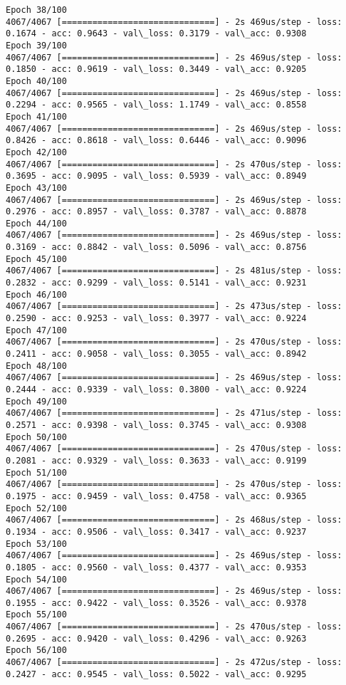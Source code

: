 \documentclass[11pt]{article}
\begin{document}
\begin{Verbatim}[commandchars=\\\{\}]
Epoch 38/100
4067/4067 [==============================] - 2s 469us/step - loss: 0.1674 - acc: 0.9643 - val\_loss: 0.3179 - val\_acc: 0.9308
Epoch 39/100
4067/4067 [==============================] - 2s 469us/step - loss: 0.1850 - acc: 0.9619 - val\_loss: 0.3449 - val\_acc: 0.9205
Epoch 40/100
4067/4067 [==============================] - 2s 469us/step - loss: 0.2294 - acc: 0.9565 - val\_loss: 1.1749 - val\_acc: 0.8558
Epoch 41/100
4067/4067 [==============================] - 2s 469us/step - loss: 0.8426 - acc: 0.8618 - val\_loss: 0.6446 - val\_acc: 0.9096
Epoch 42/100
4067/4067 [==============================] - 2s 470us/step - loss: 0.3695 - acc: 0.9095 - val\_loss: 0.5939 - val\_acc: 0.8949
Epoch 43/100
4067/4067 [==============================] - 2s 469us/step - loss: 0.2976 - acc: 0.8957 - val\_loss: 0.3787 - val\_acc: 0.8878
Epoch 44/100
4067/4067 [==============================] - 2s 469us/step - loss: 0.3169 - acc: 0.8842 - val\_loss: 0.5096 - val\_acc: 0.8756
Epoch 45/100
4067/4067 [==============================] - 2s 481us/step - loss: 0.2832 - acc: 0.9299 - val\_loss: 0.5141 - val\_acc: 0.9231
Epoch 46/100
4067/4067 [==============================] - 2s 473us/step - loss: 0.2590 - acc: 0.9253 - val\_loss: 0.3977 - val\_acc: 0.9224
Epoch 47/100
4067/4067 [==============================] - 2s 470us/step - loss: 0.2411 - acc: 0.9058 - val\_loss: 0.3055 - val\_acc: 0.8942
Epoch 48/100
4067/4067 [==============================] - 2s 469us/step - loss: 0.2444 - acc: 0.9339 - val\_loss: 0.3800 - val\_acc: 0.9224
Epoch 49/100
4067/4067 [==============================] - 2s 471us/step - loss: 0.2571 - acc: 0.9398 - val\_loss: 0.3745 - val\_acc: 0.9308
Epoch 50/100
4067/4067 [==============================] - 2s 470us/step - loss: 0.2081 - acc: 0.9329 - val\_loss: 0.3633 - val\_acc: 0.9199
Epoch 51/100
4067/4067 [==============================] - 2s 470us/step - loss: 0.1975 - acc: 0.9459 - val\_loss: 0.4758 - val\_acc: 0.9365
Epoch 52/100
4067/4067 [==============================] - 2s 468us/step - loss: 0.1934 - acc: 0.9506 - val\_loss: 0.3417 - val\_acc: 0.9237
Epoch 53/100
4067/4067 [==============================] - 2s 469us/step - loss: 0.1805 - acc: 0.9560 - val\_loss: 0.4377 - val\_acc: 0.9353
Epoch 54/100
4067/4067 [==============================] - 2s 469us/step - loss: 0.1955 - acc: 0.9422 - val\_loss: 0.3526 - val\_acc: 0.9378
Epoch 55/100
4067/4067 [==============================] - 2s 470us/step - loss: 0.2695 - acc: 0.9420 - val\_loss: 0.4296 - val\_acc: 0.9263
Epoch 56/100
4067/4067 [==============================] - 2s 472us/step - loss: 0.2427 - acc: 0.9545 - val\_loss: 0.5022 - val\_acc: 0.9295

\end{Verbatim}
\end{document}
